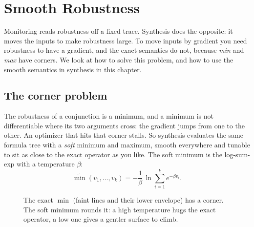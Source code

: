 \chapter{Smooth Robustness}
\label{ch:smooth}

Monitoring reads robustness off a fixed trace. Synthesis does the opposite: it moves the inputs to make robustness large. To move inputs by gradient you need robustness to have a gradient, and the exact semantics do not, because \emph{min} and \emph{max} have corners. We look at how to solve this problem, and how to use the smooth semantics in synthesis in this chapter.

\section{The corner problem}

The robustness of a conjunction is a minimum, and a minimum is not differentiable where its two arguments cross: the gradient jumps from one to the other. An optimizer that hits that corner stalls. So synthesis evaluates the same formula tree with a \emph{soft} minimum and maximum, smooth everywhere and tunable to sit as close to the exact operator as you like. The soft minimum is the log-sum-exp with a temperature $\beta$:
\begin{equation*}
\widetilde{\min}(v_1,\dots,v_k) = -\frac{1}{\beta}\,\ln\!\sum_{i=1}^{k} e^{-\beta v_i}.
\end{equation*}

\begin{figure}[h]
\centering
\begin{widefig}\end{widefig}
\caption{The exact $\min$ (faint lines and their lower envelope) has a corner. The soft minimum rounds it: a high temperature hugs the exact operator, a low one gives a gentler surface to climb.}
\label{fig:softmin}
\end{figure}

